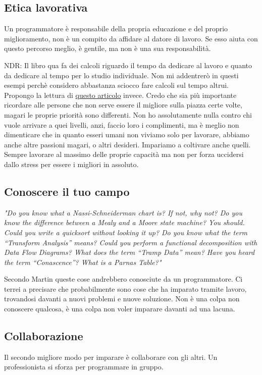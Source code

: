 \documentclass[11pt,a4paper]{book}
\begin{document}
\subsection{Etica lavorativa}
Un programmatore è responsabile della propria educazione e del proprio miglioramento, non è un compito da affidare al datore di lavoro. Se esso aiuta con questo percorso meglio, è gentile, ma non è una sua responsabilità.

NDR: Il libro qua fa dei calcoli riguardo il tempo da dedicare al lavoro e quanto da dedicare al tempo per lo studio individuale. Non mi addentrerò in questi esempi perchè considero abbastanza sciocco fare calcoli sul tempo altrui. Propongo la lettura di \href{https://muldoon.cloud/programming/2020/04/17/programming-rules-thumb.html}{questo articolo} invece. Credo che sia più importante ricordare alle persone che non serve essere il migliore sulla piazza certe volte, magari le proprie priorità sono differenti. Non ho assolutamente nulla contro chi vuole arrivare a quei livelli, anzi, faccio loro i complimenti, ma è meglio non dimenticare che in quanto esseri umani non viviamo solo per lavorare, abbiamo anche altre passioni magari, o altri desideri. Impariamo a coltivare anche quelli. Sempre lavorare al massimo delle proprie capacità ma non per forza uccidersi dallo stress per essere i migliori in assoluto.

\subsection{Conoscere il tuo campo}
\textit{"Do you know what a Nassi-Schneiderman chart is? If not, why not? Do you
know the difference between a Mealy and a Moore state machine? You should.
Could you write a quicksort without looking it up? Do you know what the term
“Transform Analysis” means? Could you perform a functional decomposition
with Data Flow Diagrams? What does the term “Tramp Data” mean? Have you
heard the term “Conascence”? What is a Parnas Table?"}

Secondo Martin queste cose andrebbero conosciute da un programmatore. Ci terrei a precisare che probabilmente sono cose che ha imparato tramite lavoro, trovandosi davanti a nuovi problemi e nuove soluzione. Non è una colpa non conoscere qualcosa, è una colpa non voler imparare davanti ad una lacuna.

\subsection{Collaborazione}
Il secondo migliore modo per imparare è collaborare con gli altri. Un professionista si sforza per programmare in gruppo.
\end{document}
